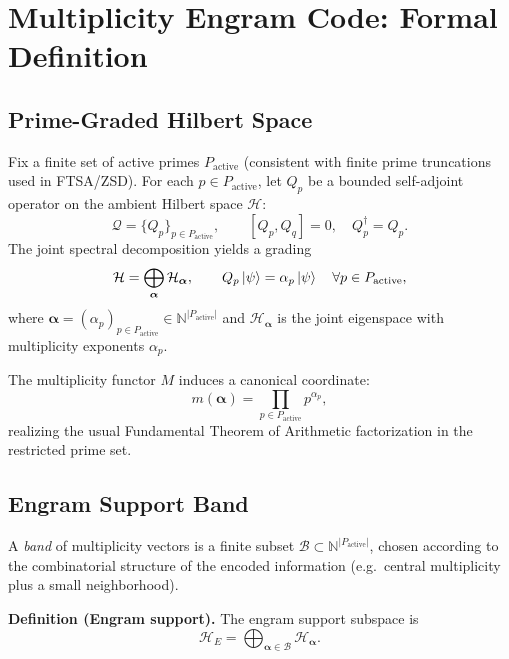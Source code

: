 \documentclass[11pt]{article}
\begin{document}
\section{Multiplicity Engram Code: Formal Definition}

\subsection{Prime-Graded Hilbert Space}

Fix a finite set of active primes $P_{\text{active}}$ (consistent with finite
prime truncations used in FTSA/ZSD). For each $p \in P_{\text{active}}$, let
$Q_p$ be a bounded self-adjoint operator on the ambient Hilbert space
$\mathcal H$:
\begin{equation}
  \mathcal Q = \{ Q_p \}_{p \in P_{\text{active}}}, \qquad
  [Q_p, Q_q] = 0, \quad Q_p^\dagger = Q_p.
\end{equation}
The joint spectral decomposition yields a grading
\begin{equation}
  \mathcal H = \bigoplus_{\boldsymbol\alpha} \mathcal H_{\boldsymbol\alpha},
  \qquad
  Q_p \ket{\psi} = \alpha_p \ket{\psi} \quad
  \forall p \in P_{\text{active}},
  \label{eq:joint-eigenspaces}
\end{equation}
where $\boldsymbol\alpha = (\alpha_p)_{p \in P_{\text{active}}} \in
\mathbb N^{|P_{\text{active}}|}$ and $\mathcal H_{\boldsymbol\alpha}$ is the
joint eigenspace with multiplicity exponents $\alpha_p$.

The multiplicity functor $M$ induces a canonical coordinate:
\begin{equation}
  m(\boldsymbol\alpha)
  = \prod_{p \in P_{\text{active}}} p^{\alpha_p},
\end{equation}
realizing the usual Fundamental Theorem of Arithmetic factorization in the
restricted prime set.

\subsection{Engram Support Band}

A \emph{band} of multiplicity vectors is a finite subset
$\mathcal B \subset \mathbb N^{|P_{\text{active}}|}$, chosen according to
the combinatorial structure of the encoded information (e.g.\ central
multiplicity plus a small neighborhood).

\textbf{Definition (Engram support).} The engram support subspace is
\begin{equation}
  \mathcal H_E
  = \bigoplus_{\boldsymbol\alpha \in \mathcal B}
    \mathcal H_{\boldsymbol\alpha}.
\end{equation}
\end{document}

